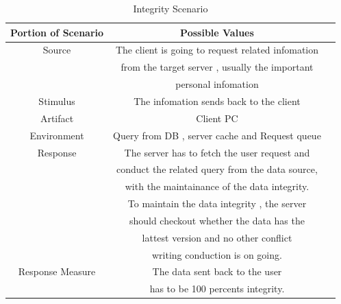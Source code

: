 \documentclass{article}
\begin{document}
	\begin{center}
		\begin{table}[!htb]
		\begin{tabular}{ccc}
		\toprule  
		Portion of Scenario & Possible Values\\
		\midrule 
		Source 				& The client is going to request related infomation \\
							& from the target server , usually the important \\
							& personal infomation\\
		Stimulus 			& The infomation sends back to the client\\
		Artifact 			& Client PC	\\
		Environment 		& Query from DB , server cache and Request queue\\
		Response 			& The server has to fetch the user request and \\
							& conduct the related query from the data source,\\
							& with the maintainance of the data integrity. \\
							& To maintain the data integrity , the server \\
							& should checkout whether the data has the \\
							& lattest version and no other conflict \\
							& writing conduction is on going.\\
		Response Measure 	& The data sent back to the user\\
							& has to be 100 percents integrity.\\

		\bottomrule
		\end{tabular}
		\caption{Integrity Scenario}
		\end{table}
	\end{center}
	
\end{document}
